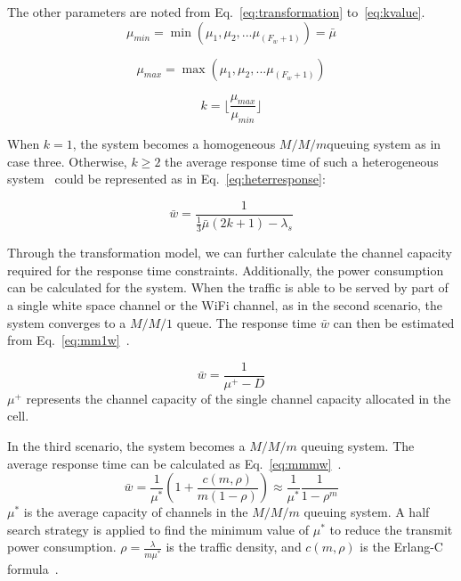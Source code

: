 The other parameters are noted from Eq.~\ref{eq:transformation} to~\ref{eq:kvalue}.
\begin{equation}
\label{eq:transformation}
\mu_{min}=\min{(\mu_1,\mu_2,...\mu_{(F_w+1)})} = \bar{\mu}
\end{equation}

\begin{equation}
\mu_{max}=\max{(\mu_1,\mu_2,...\mu_{(F_w+1)})} 
\end{equation}

\begin{equation}
\label{eq:kvalue}
k= \lfloor\frac{\mu_{max}}{\mu_{min}} \rfloor
\end{equation}

When $k=1$, the system becomes a homogeneous $M/M/m$queuing system as in case three. Otherwise,   
$k\ge2$ the average response time of such a heterogeneous system~\cite{yu2008transformation} 
could be represented as in Eq.~\ref{eq:heterresponse}:

\begin{equation}
\label{eq:heterresponse}
\bar{w}=\frac{1}{\frac{1}{3}\bar{\mu}(2k+1)-\lambda_s}
\end{equation}

Through the transformation model, we can further calculate the channel capacity required for the response time constraints. 
Additionally, the power consumption can be calculated for the system.
When the traffic is able to be served by part of a single white space channel or the WiFi channel, as in
the second scenario, the system converges to a $M/M/1$ queue. The response time $\bar{w}$ 
can then be estimated from Eq.~\ref{eq:mm1w}~\cite{gelenbe1998introduction}.

\begin{equation}
\label{eq:mm1w}
\bar{w}=\frac{1}{\mu^+-D}
\end{equation}
$\mu^+$ represents the channel capacity of the single channel capacity allocated in the cell.

In the third scenario, the system becomes a $M/M/m$ queuing system. 
The average response time can be calculated as Eq.~\ref{eq:mmmw}~\cite{gelenbe1998introduction}.
\begin{equation}
\label{eq:mmmw}
\bar{w} = \frac{1}{\mu^*}(1+\frac{c(m,\rho)}{m(1-\rho)})\approx \frac{1}{\mu^*}\frac{1}{1-\rho^m}
\end{equation}
$\mu^*$ is the average capacity of channels in the $M/M/m$ queuing system.
A half search strategy is applied to find the minimum value of $\mu^*$ to reduce the transmit power
consumption.
$\rho=\frac{\lambda}{m\mu^*}$ is the traffic density, and $c(m,\rho)$ is the Erlang-C 
formula~\cite{gelenbe1998introduction}.



